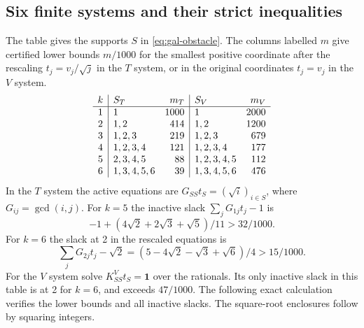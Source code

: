 \documentclass[11pt,a4paper]{article}
\begin{document}
\subsection{Six finite systems and their strict inequalities}
The table gives the supports $S$ in \eqref{eq:gal-obstacle}. The columns labelled $m$ give certified lower bounds $m/1000$ for the smallest positive coordinate after the rescaling $t_j=v_j/\sqrt j$ in the $T$ system, or in the original coordinates $t_j=v_j$ in the $V$ system.
\[
\begin{array}{c|l r|l r}
k&S_T&m_T&S_V&m_V\\ \hline
1&1&1000&1&2000\\
2&1,2&414&1,2&1200\\
3&1,2,3&219&1,2,3&679\\
4&1,2,3,4&121&1,2,3,4&177\\
5&2,3,4,5&88&1,2,3,4,5&112\\
6&1,3,4,5,6&39&1,3,4,5,6&476
\end{array}
\]
In the $T$ system the active equations are $G_{SS}t_S=(\sqrt i)_{i\in S}$, where $G_{ij}=\gcd(i,j)$. For $k=5$ the inactive slack $\sum_j G_{1j}t_j-1$ is
\[
 -1+(4\sqrt2+2\sqrt3+\sqrt5)/11>32/1000 .
\]
For $k=6$ the slack at 2 in the rescaled equations is
\[
 \sum_jG_{2j}t_j-\sqrt2=(5-4\sqrt2-\sqrt3+\sqrt6)/4>15/1000 .
\]
For the $V$ system solve $K^V_{SS}t_S=\boldsymbol1$ over the rationals. Its only inactive slack in this table is at 2 for $k=6$, and exceeds $47/1000$. The following exact calculation verifies the lower bounds and all inactive slacks. The square-root enclosures follow by squaring integers.
\end{document}
